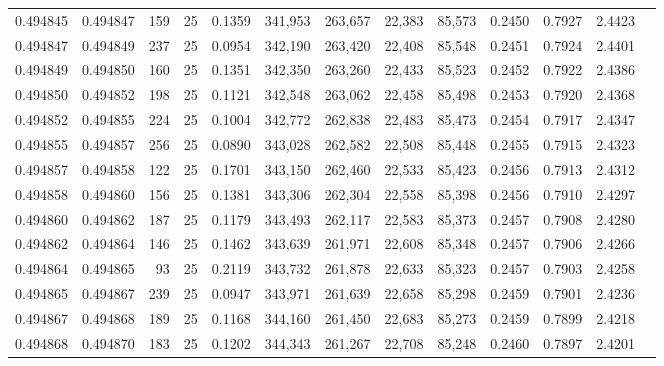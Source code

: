 \begin{tabular}{rrrrrrrrrrrrr}
0.494845 & 0.494847 &   159 &  25 &                                     0.1359 & 341,953 & 263,657 &  22,383 &  85,573 & 0.2450 & 0.7927 & 2.4423 \\
0.494847 & 0.494849 &   237 &  25 &                                     0.0954 & 342,190 & 263,420 &  22,408 &  85,548 & 0.2451 & 0.7924 & 2.4401 \\
0.494849 & 0.494850 &   160 &  25 &                                     0.1351 & 342,350 & 263,260 &  22,433 &  85,523 & 0.2452 & 0.7922 & 2.4386 \\
0.494850 & 0.494852 &   198 &  25 &                                     0.1121 & 342,548 & 263,062 &  22,458 &  85,498 & 0.2453 & 0.7920 & 2.4368 \\
0.494852 & 0.494855 &   224 &  25 &                                     0.1004 & 342,772 & 262,838 &  22,483 &  85,473 & 0.2454 & 0.7917 & 2.4347 \\
0.494855 & 0.494857 &   256 &  25 &                                     0.0890 & 343,028 & 262,582 &  22,508 &  85,448 & 0.2455 & 0.7915 & 2.4323 \\
0.494857 & 0.494858 &   122 &  25 &                                     0.1701 & 343,150 & 262,460 &  22,533 &  85,423 & 0.2456 & 0.7913 & 2.4312 \\
0.494858 & 0.494860 &   156 &  25 &                                     0.1381 & 343,306 & 262,304 &  22,558 &  85,398 & 0.2456 & 0.7910 & 2.4297 \\
0.494860 & 0.494862 &   187 &  25 &                                     0.1179 & 343,493 & 262,117 &  22,583 &  85,373 & 0.2457 & 0.7908 & 2.4280 \\
0.494862 & 0.494864 &   146 &  25 &                                     0.1462 & 343,639 & 261,971 &  22,608 &  85,348 & 0.2457 & 0.7906 & 2.4266 \\
0.494864 & 0.494865 &    93 &  25 &                                     0.2119 & 343,732 & 261,878 &  22,633 &  85,323 & 0.2457 & 0.7903 & 2.4258 \\
0.494865 & 0.494867 &   239 &  25 &                                     0.0947 & 343,971 & 261,639 &  22,658 &  85,298 & 0.2459 & 0.7901 & 2.4236 \\
0.494867 & 0.494868 &   189 &  25 &                                     0.1168 & 344,160 & 261,450 &  22,683 &  85,273 & 0.2459 & 0.7899 & 2.4218 \\
0.494868 & 0.494870 &   183 &  25 &                                     0.1202 & 344,343 & 261,267 &  22,708 &  85,248 & 0.2460 & 0.7897 & 2.4201 \\

\end{tabular}
